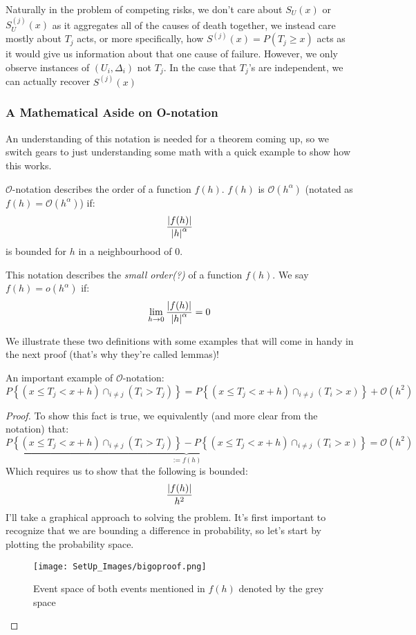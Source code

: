 \documentclass[10pt]{article}
\newcommand{\parenth}[1]{{\left(#1\right)}}
\newcommand{\bracketh}[1]{{\left\{#1\right\}}}
\newcommand{\limzero}[1]{\lim_{#1 \rightarrow 0}}
\begin{document}
Naturally in the problem of competing risks, we don't care about $S_U(x)$ or $S_U^\parenth{j}(x)$ as it aggregates all of the causes of death together, we instead care mostly about $T_j$ acts, or more specifically, how $S^\parenth{j}(x)=P(T_j\geq x)$ acts as it would give us information about that one cause of failure. However, we only observe instances of $(U_i, \Delta_i)$ not $T_j$. In the case that $T_j$'s are independent, we can actually recover $S^\parenth{j}(x)$\\

\subsubsection{A Mathematical Aside on O-notation}

An understanding of this notation is needed for a theorem coming up, so we switch gears to just understanding some math with a quick example to show how this works.

\begin{definition}
\label{defn:bigO}
    $\mathcal{O}$-notation describes the order of a function $f(h)$. $f(h)$ is $\mathcal{O}(h^\alpha)$ (notated as $f(h) = \mathcal{O}(h^\alpha)$) if:
    $$\frac{\abs{f(h)}}{\abs{h}^\alpha}$$
    is bounded for $h$ in a neighbourhood of 0.
\end{definition}

\begin{definition}
\label{defn:littleo}
    This notation describes the \textit{small order(?)} of a function $f(h)$. We say $f(h) = o(h^\alpha)$ if:
    $$\limzero{h}\frac{\abs{f(h)}}{\abs{h}^\alpha}=0$$
\end{definition}

We illustrate these two definitions with some examples that will come in handy in the next proof (that's why they're called lemmas)!

\begin{lemma}
\label{lem:competeriskO}
An important example of $\mathcal{O}$-notation:
    \label{result:probjoint_to_h}$$P\bracketh{(x\leq T_j<x+h) \cap_{i\neq j}(T_i > T_j)} = P\bracketh{(x\leq T_j<x+h) \cap_{i\neq j}(T_i > x)} + \mathcal{O}(h^2)$$
\end{lemma}

\begin{proof}
    To show this fact is true, we equivalently (and more clear from the notation) that:
    $$\underbrace{P\bracketh{(x\leq T_j<x+h) \cap_{i\neq j}(T_i > T_j)}  -P\bracketh{(x\leq T_j<x+h) \cap_{i\neq j}(T_i > x)}}_{:=f(h)} =\mathcal{O}(h^2)$$
    Which requires us to show that the following is bounded:
    $$\frac{\abs{f(h)}}{h^2}$$
    I'll take a graphical approach to solving the problem. It's first important to recognize that we are bounding a difference in probability, so let's start by plotting the probability space.

    \begin{figure}[H]
        \texttt{[image: SetUp\_Images/bigoproof.png]}
        \caption{Event space of both events mentioned in $f(h)$ denoted by the grey space}
    \end{figure}
\end{proof}
\end{document}
